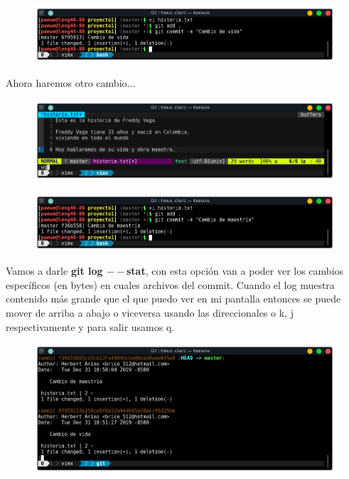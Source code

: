 \documentclass{article}
\begin{document}
\begin{figure}[h!]
  \centering
  \includegraphics[scale=0.75]{./Pictures/117_commit.png}
\end{figure}

Ahora haremos otro cambio...

\begin{figure}[h!]
  \centering
  \includegraphics[scale=0.75]{./Pictures/118_historia_changed.png}
\end{figure}

\newpage

\begin{figure}[h!]
  \centering
  \includegraphics[scale=0.75]{./Pictures/119_commit.png}
\end{figure}

Vamos a darle \textbf{git log $--$stat}, con esta opción van a poder ver los
cambios específicos (en bytes) en cuales archivos del commit. Cuando el log
muestra contenido más grande que el que puedo ver en mi pantalla entonces se
puede mover de arriba a abajo o viceversa usando las direccionales o k, j
respectivamente y para salir usamos q.

\begin{figure}[h!]
  \centering
  \includegraphics[scale=0.75]{./Pictures/120_log_stat.png}
\end{figure}
\end{document}
